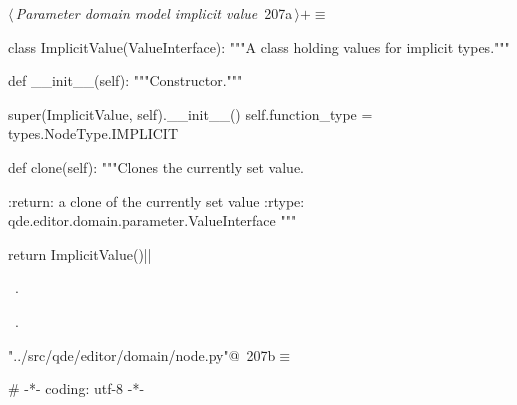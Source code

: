 \documentclass[%
    a4paper,    %
    justified,  %
    nobib,      %
    openany     %
]{tufte-book}
\makeatletter
\renewcommand{\label}[1]{\@tufte@label{##1}}%
\makeatother
\begin{document}
\begin{fullwidth}
\begin{flushleft}
\begin{minipage}{\linewidth}
\begin{list}{}{\setlength{\itemsep}{-\parsep}\setlength{\itemindent}{-\leftmargin}}
\item{}
\end{list}
\end{minipage}\vspace{4ex}
\end{flushleft}
\begin{flushleft} \small
\begin{minipage}{\linewidth}\label{scrap203}\raggedright\small
{} $\langle\,${\itshape Parameter domain model implicit value}\nobreak\ {\footnotesize {207a}}$\,\rangle+\equiv$
\vspace{-1ex}
\begin{pythoncode}
class ImplicitValue(ValueInterface):
    """A class holding values for implicit types."""

    def __init__(self):
        """Constructor."""

        super(ImplicitValue, self).__init__()
        self.function_type = types.NodeType.IMPLICIT

    def clone(self):
        """Clones the currently set value.

        :return: a clone of the currently set value
        :rtype:  qde.editor.domain.parameter.ValueInterface
        """

        return ImplicitValue()|\NWsep|
\end{pythoncode}
\vspace{1.5ex}
\footnotesize
\begin{list}{}{\setlength{\itemsep}{-\parsep}\setlength{\itemindent}{-\leftmargin}}
\item \NWtxtMacroDefBy\ .
\item \NWtxtMacroRefIn\ .

\item{}
\end{list}
\end{minipage}\vspace{4ex}
\end{flushleft}

\begin{flushleft} \small
\begin{minipage}{\linewidth}\label{scrap204}\raggedright\small
{} \verb@"../src/qde/editor/domain/node.py"@\nobreak\ {\footnotesize {207b}}$\equiv$
\vspace{-1ex}
\begin{pythoncode}
# -*- coding: utf-8 -*-


\end{pythoncode}
\end{minipage}
\end{flushleft}
\end{fullwidth}
\end{document}
